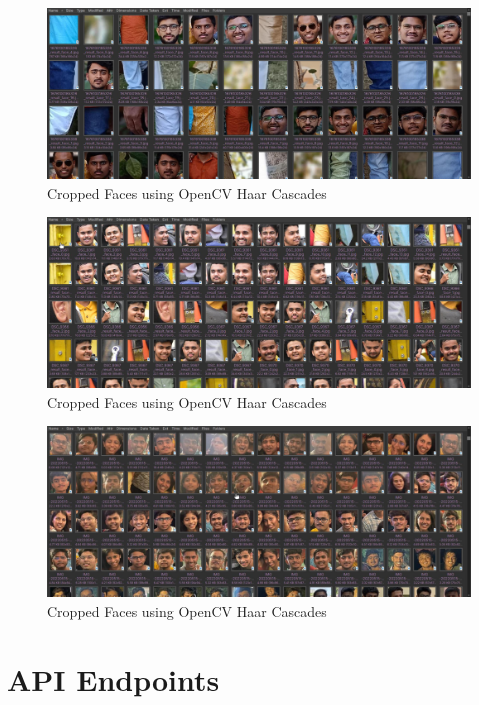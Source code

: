 \documentclass[openany]{report}
\begin{document}
\begin{figure}[H]
    \centering
    \includegraphics[width=.95\textwidth]{../imgs/Cropped images.png}
    \caption{Cropped Faces using OpenCV Haar Cascades}
\end{figure}

\begin{figure}[H]
    \centering
    \includegraphics[width=.95\textwidth]{../imgs/Copped images 2.png}
    \caption{Cropped Faces using OpenCV Haar Cascades}
\end{figure}

\begin{figure}[H]
    \centering
    \includegraphics[width=.95\textwidth]{../imgs/Copped images 3.png}
    \caption{Cropped Faces using OpenCV Haar Cascades}
\end{figure}

\section{API Endpoints}
\end{document}
